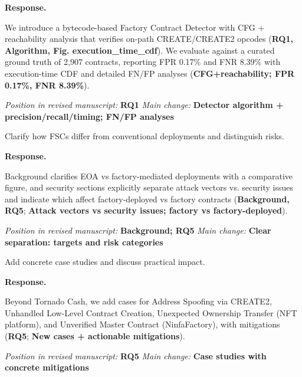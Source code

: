 \documentclass[acmsmall]{acmart}
\begin{document}
	\noindent
	\textbf{Response.}

	We introduce a bytecode-based Factory Contract Detector with CFG + reachability analysis that
	verifies on-path CREATE/CREATE2 opcodes ({\textbf{RQ1, Algorithm, Fig. execution\_time\_cdf}}). We
	evaluate against a curated ground truth of 2,907 contracts, reporting FPR 0.17\% and FNR 8.39\%
	with execution-time CDF and detailed FN/FP analyses ({\textbf{CFG+reachability; FPR 0.17\%, FNR 8.39\%}}).

\vspace{0.25em}
\noindent\textit{Position in revised manuscript:} {\color{red}\textbf{RQ1}}
\noindent\textit{Main change:} {\color{blue}\textbf{Detector algorithm + precision/recall/timing; FN/FP analyses}}

	\begin{tcolorbox}
		[commentbox,title=Editor/AE -- Comment 3] Clarify how FSCs differ from conventional
		deployments and distinguish risks.
	\end{tcolorbox}

	\noindent
	\textbf{Response.}

	Background clarifies EOA vs factory-mediated deployments with a comparative figure, and security
	sections explicitly separate attack vectors vs. security issues and indicate which affect factory-deployed
	vs factory contracts ({\textbf{Background, RQ5}}; {\textbf{Attack vectors vs security issues; factory vs factory-deployed}}).

\vspace{0.25em}
\noindent\textit{Position in revised manuscript:} {\color{red}\textbf{Background; RQ5}}
\noindent\textit{Main change:} {\color{blue}\textbf{Clear separation: targets and risk categories}}

	\begin{tcolorbox}
		[commentbox,title=Editor/AE -- Comment 4] Add concrete case studies and discuss practical
		impact.
	\end{tcolorbox}

	\noindent
	\textbf{Response.}

	Beyond Tornado Cash, we add cases for Address Spoofing via CREATE2, Unhandled Low-Level Contract
	Creation, Unexpected Ownership Transfer (NFT platform), and Unverified Master Contract (NinfaFactory),
	with mitigations ({\textbf{RQ5}}; {\textbf{New cases + actionable mitigations}}).

	\vspace{0.25em}
\noindent\textit{Position in revised manuscript:} {\color{red}\textbf{RQ5}}
\noindent\textit{Main change:} {\color{blue}\textbf{Case studies with concrete mitigations}}
\end{document}
